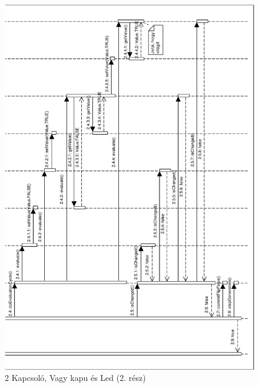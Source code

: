 \begin{figure}[H]
\begin{center}
\includegraphics[width=16cm]{chapters/chapter05/imgs/test3-2.pdf}
\caption{2 Kapcsoló, Vagy kapu és Led (2. rész)}
\label{fig:init}
\end{center}
\end{figure}

